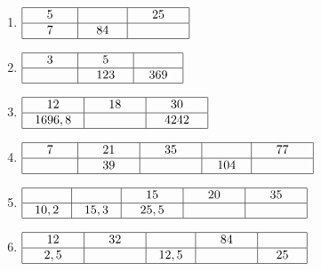 \documentclass[12 pt]{extarticle}
\theoremstyle{plain}
\begin{document}
\begin{enumerate}
\item $
\begin{array}{|c|c|c|}
\hline
\phantom{000}     5   \phantom{000} 
& \phantom{000}       \phantom{000} & 
\phantom{000} 25
\phantom{000}\\
\hline
 7 &  84 & \\
\hline
\end{array}$

\item $
\begin{array}{|c|c|c|}
\hline
\phantom{000}    3    \phantom{000} 
& \phantom{000}     5  \phantom{000} & 
\phantom{000}
\phantom{000}\\
\hline
 & 123 & 369 \\
\hline
\end{array}$

\item $
\begin{array}{|c|c|c|}
\hline
\phantom{000}     12   \phantom{000} 
& \phantom{000}   18    \phantom{000} & 
\phantom{000}
30
\phantom{000}\\
\hline
 1696,8&  & 4242 \\
\hline
\end{array}$

\item $
\begin{array}{|c|c|c|c|c|}
\hline
\phantom{000}    7    \phantom{000} 
& \phantom{000}   21    \phantom{000} 
& \phantom{000}   35    \phantom{000} 
& \phantom{000}       \phantom{000} 
& 
\phantom{000}
77
\phantom{000}\\
\hline

 &39  & &104 & \\
\hline
\end{array}$

\item $
\begin{array}{|c|c|c|c|c|}
\hline
\phantom{000}        \phantom{000} 
& \phantom{000}       \phantom{000} 
& \phantom{000}     15  \phantom{000} 
& \phantom{000}      20 \phantom{000} 
& 
\phantom{000}
35
\phantom{000}\\
\hline

 10,2& 15,3 &25,5 & & \\
\hline
\end{array}$

\item $
\begin{array}{|c|c|c|c|c|}
\hline
\phantom{000}     12   \phantom{000} 
& \phantom{000}     32  \phantom{000} 
& \phantom{000}       \phantom{000} 
& \phantom{000}     84  \phantom{000} 
& 
\phantom{000}

\phantom{000}\\
\hline

 2,5 &  & 12,5 & &  25\\
\hline
\end{array}$
\end{enumerate}
\end{document}
